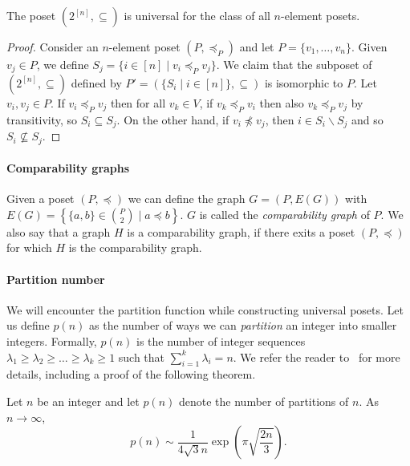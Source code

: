\documentclass[11pt]{article}
\newcommand{\1}{\mathbbm{1}}
\let\setminus=\smallsetminus
\def\cleq{\preccurlyeq}
\begin{document}
\begin{proposition}
    \label{prop:hypercube_univ}
    The poset $(2^{[n]},\subseteq)$ is universal for the class of all $n$-element posets.
\end{proposition}

\begin{proof}
    Consider an $n$-element poset $(P,\cleq_P)$ and let $P=\{v_1,\dots,v_n\}$. Given $v_j \in P$, we define $S_j = \{ i \in [n] \mid v_i \cleq_P v_j \}$. We claim that the subposet of $(2^{[n]},\subseteq)$ defined by $P' = (\{S_i \mid i \in [n]\}, \subseteq)$ is isomorphic to $P$.
    Let $v_i,v_j\in P$. If $v_i \cleq_P v_j$ then for all $v_k \in V$, if $v_k \cleq_P v_i$ then also $v_k \cleq_P v_j$ by transitivity, so $S_i \subseteq S_j$. On the other hand, if $v_i\not\cleq v_j$, then $i \in S_i \setminus S_j$  and so $S_i\not\subseteq S_j$.
\end{proof}

\paragraph{Comparability graphs} Given a poset $(P,\cleq)$ we can define the graph $G = (P,E(G))$ with $E(G) = \left\{\{a,b\} \in \binom{P}{2} \mid a \cleq b \right\}$. $G$ is called the \emph{comparability graph} of $P$. We also say that a graph $H$ is a comparability graph, if there exits a poset $(P,\cleq)$ for which $H$ is the comparability graph. 


\paragraph{Partition number} We will encounter the partition function while constructing universal posets. Let us define $p(n)$ as the number of ways we can \emph{partition} an integer into smaller integers. Formally, $p(n)$ is the number of integer sequences $\lambda_1
\geq \lambda_2\geq  \ldots\geq  \lambda_k \geq 1$ such that $\sum_{i=1}^{k} \lambda_i = n$. We refer the reader to~\cite{andrews1998theory} for more details, including a proof of the following theorem.

\begin{theorem}
    \label{thm:partition}
Let $n$ be an integer and let $p(n)$ denote the number of partitions of $n$. As $n\to \infty$, 
\[
p(n) \sim \frac{1}{4\sqrt{3}n} \exp\left(\pi \sqrt{\frac{2n}{3}}\right).
\]
\end{theorem}
\end{document}
